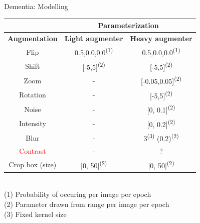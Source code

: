 \documentclass[c]{beamer}
\begin{document}
	\begin{frame}{Dementia: Modelling} %
		\centering
	    \begin{tabular}{|c|c|c|}
	        \multicolumn{1}{c}{}&\multicolumn{2}{c}{\scriptsize{Parameterization}}\\
	        \hline
	        \textbf{\scriptsize{Augmentation}}&\textbf{\scriptsize{Light augmenter}}&\textbf{\scriptsize{Heavy augmenter}}\\
	        \hline
	        \scriptsize{Flip}&\scriptsize{0.5,0.0,0.0\textsuperscript{(1)}}&\scriptsize{0.5,0.0,0.0\textsuperscript{(1)}}\\
	        \hline
	        \scriptsize{Shift}&\scriptsize{[-5,5]\textsuperscript{(2)}}&\scriptsize{[-5,5]\textsuperscript{(2)}}\\
	        \hline
	        \scriptsize{Zoom}&\scriptsize{-}&\scriptsize{[-0.05,0.05]\textsuperscript{(2)}}\\
	        \hline
	        \scriptsize{Rotation}&\scriptsize{-}&\scriptsize{[-5,5]\textsuperscript{(2)}}\\
	        \hline
	        \scriptsize{Noise}&\scriptsize{-}&\scriptsize{[0, 0.1]\textsuperscript{(2)}}\\
	        \hline
	        \scriptsize{Intensity}&\scriptsize{-}&\scriptsize{[0, 0.2]\textsuperscript{(2)}}\\
	        \hline
	        \scriptsize{Blur}&\scriptsize{-}&\scriptsize{3\textsuperscript{(3)} (0.2)\textsuperscript{(2)}}\\
	        \hline
	        \scriptsize{\textcolor{red}{Contrast}}&\scriptsize{\textcolor{red}{-}}&\scriptsize{\textcolor{red}{?}}\\
	        \hline
	        \scriptsize{Crop box (size)}&\scriptsize{[0, 50]\textsuperscript{(2)}}&\scriptsize{[0, 50]\textsuperscript{(2)}}\\
	        \hline
	    \end{tabular}\\
	    \vspace{0.2cm}
	    \tiny{(1) Probability of occuring per image per epoch}\\
	    \tiny{(2) Parameter drawn from range per image per epoch}\\
	    \tiny{(3) Fixed kernel size}\\
	\end{frame}	
	
\end{document}
